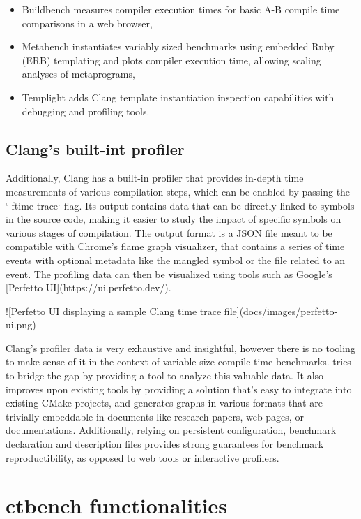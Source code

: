 \documentclass[../../main.tex]{subfiles}
\begin{document}
\begin{itemize}
\item Buildbench\cite{buildbench} measures compiler execution times for basic
      A-B compile time comparisons in a web browser,
\item Metabench\cite{metabench} instantiates variably sized benchmarks using embedded
      Ruby (ERB) templating and plots compiler execution time, allowing scaling
      analyses of metaprograms,
\item Templight\cite{templight} adds Clang template instantiation inspection
      capabilities with debugging and profiling tools.
\end{itemize}

\subsection{Clang's built-int profiler}

Additionally, Clang has a built-in profiler\cite{time-trace} that provides in-depth
time measurements of various compilation steps, which can be enabled by passing
the `-ftime-trace` flag. Its output contains data that can be directly linked to
symbols in the source code, making it easier to study the impact of specific
symbols on various stages of compilation. The output format is a JSON file meant
to be compatible with Chrome's flame graph visualizer, that contains a series of
time events with optional metadata like the mangled \cpp symbol or the file
related to an event. The profiling data can then be visualized using tools such
as Google's [Perfetto UI](https://ui.perfetto.dev/).

![Perfetto UI displaying a sample Clang time trace file](docs/images/perfetto-ui.png)

Clang's profiler data is very exhaustive and insightful, however there is no
tooling to make sense of it in the context of variable size compile time
benchmarks. \ctbench tries to bridge the gap by providing a tool to analyze
this valuable data. It also improves upon existing tools by providing a solution
that's easy to integrate into existing CMake projects, and generates graphs in
various formats that are trivially embeddable in documents like research papers,
web pages, or documentations. Additionally, relying on persistent configuration,
benchmark declaration and description files provides strong guarantees for
benchmark reproductibility, as opposed to web tools or interactive profilers.

\section{ctbench functionalities}
\end{document}
